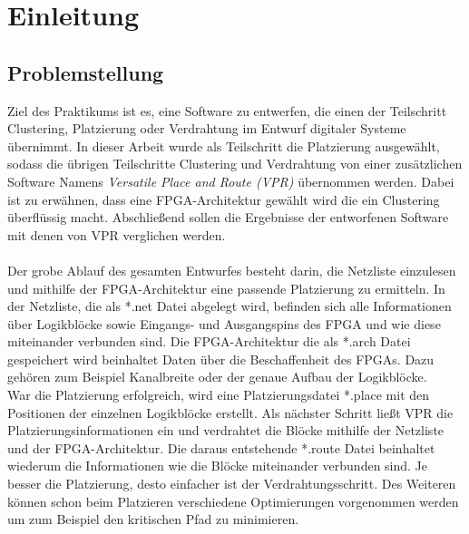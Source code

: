 \chapter{Einleitung}

    \section{Problemstellung}
        Ziel des Praktikums ist es, eine Software zu entwerfen, die einen der Teilschritt Clustering,
        Platzierung oder Verdrahtung im Entwurf digitaler Systeme übernimmt.
        In dieser Arbeit wurde als Teilschritt die Platzierung ausgewählt,
        sodass die übrigen Teilschritte Clustering und Verdrahtung von einer zusätzlichen Software Namens
        \textit{Versatile Place and Route (VPR)} übernommen werden.
        Dabei ist zu erwähnen, dass eine FPGA-Architektur gewählt wird die ein Clustering überflüssig macht.
        Abschließend sollen die Ergebnisse der entworfenen Software mit denen von VPR verglichen werden.
        \\\\
        Der grobe Ablauf des gesamten Entwurfes besteht darin, die Netzliste einzulesen und
        mithilfe der FPGA-Architektur eine passende Platzierung zu ermitteln.
        In der Netzliste, die als *.net Datei abgelegt wird, befinden sich alle Informationen über
        Logikblöcke sowie Eingangs- und Ausgangspins des FPGA und wie diese miteinander verbunden sind.
        Die FPGA-Architektur die als *.arch Datei gespeichert wird beinhaltet Daten über die Beschaffenheit des FPGAs.
        Dazu gehören zum Beispiel Kanalbreite oder der genaue Aufbau der Logikblöcke.
        \\
        War die Platzierung erfolgreich, wird eine Platzierungsdatei *.place mit den Positionen der einzelnen Logikblöcke erstellt.
        Als nächster Schritt ließt VPR die Platzierungsinformationen ein und verdrahtet die Blöcke mithilfe der Netzliste und der FPGA-Architektur.
        Die daraus entstehende *.route Datei beinhaltet wiederum die Informationen wie die Blöcke miteinander verbunden sind.
        Je besser die Platzierung, desto einfacher ist der Verdrahtungsschritt.
        Des Weiteren können schon beim Platzieren verschiedene Optimierungen vorgenommen werden um zum Beispiel den kritischen Pfad zu minimieren.

